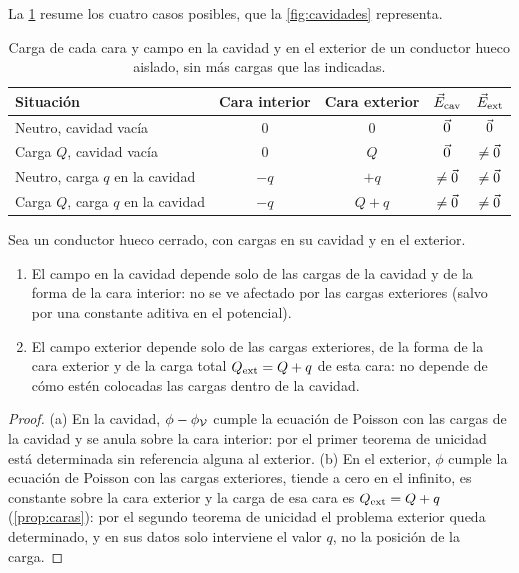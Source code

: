 

La \cref{tab:cavidades} resume los cuatro casos posibles, que la \cref{fig:cavidades} representa.

\begin{table}[ht]
\centering
\caption{Carga de cada cara y campo en la cavidad y en el exterior de un conductor hueco aislado, sin más cargas que las indicadas.}
\label{tab:cavidades}
\begin{tabular}{@{}lcccc@{}}
  \toprule
  Situación & Cara interior & Cara exterior & $\vec{E}_{\mathrm{cav}}$ & $\vec{E}_{\mathrm{ext}}$\\
  \midrule
  Neutro, cavidad vacía                 & $0$  & $0$    & $\vec{0}$        & $\vec{0}$\\
  Carga $Q$, cavidad vacía              & $0$  & $Q$    & $\vec{0}$        & $\neq\vec{0}$\\
  Neutro, carga $q$ en la cavidad       & $-q$ & $+q$   & $\neq\vec{0}$    & $\neq\vec{0}$\\
  Carga $Q$, carga $q$ en la cavidad    & $-q$ & $Q+q$  & $\neq\vec{0}$    & $\neq\vec{0}$\\
  \bottomrule
\end{tabular}
\end{table}

\begin{teorema}\label{teo:apantallamiento}
Sea un conductor hueco cerrado, con cargas en su cavidad y en el exterior.
\begin{enumerate}[label=\textup{(\alph*)}]
  \item El campo en la cavidad depende solo de las cargas de la cavidad y de la forma de la cara interior: no se ve afectado por las cargas
        exteriores (salvo por una constante aditiva en el potencial).
  \item El campo exterior depende solo de las cargas exteriores, de la forma de la cara exterior y de la carga total $Q_{\mathrm{ext}}=Q+q$ de esta cara: no
        depende de cómo estén colocadas las cargas dentro de la cavidad.
\end{enumerate}
\end{teorema}
\begin{proof}
(a) En la cavidad, $\phi-\phi_{\mathcal{V}}$ cumple la ecuación de Poisson con las cargas de la cavidad y se anula sobre la cara interior: por el primer
teorema de unicidad está determinada sin referencia alguna al exterior. (b) En el exterior, $\phi$ cumple la ecuación de Poisson con las cargas
exteriores, tiende a cero en el infinito, es constante sobre la cara exterior y la carga de esa cara es $Q_{\mathrm{ext}}=Q+q$ (\cref{prop:caras}): por el segundo
teorema de unicidad el problema exterior queda determinado, y en sus datos solo interviene el valor $q$, no la posición de la carga.
\end{proof}

